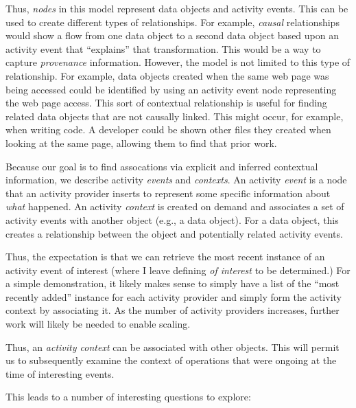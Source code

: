 \documentclass[sigconf,anonymous,review]{acmart}
\begin{document}
Thus, \emph{nodes} in this model represent data objects and activity events.
This can be used to create different types of relationships.  For example,
\emph{causal} relationships would show a flow from one data object to a second
data object based upon an activity event that ``explains'' that transformation.
This would be a way to capture \emph{provenance} information.  However, the
model is not limited to this type of relationship.  For example, data objects
created when the same web page was being accessed could be identified by using
an activity event node representing the web page access.  This sort of
contextual relationship is useful for finding related data objects that are not
causally linked.  This might occur, for example, when writing code.  A developer
could be shown other files they created when looking at the same page, allowing
them to find that prior work.

Because our goal is to find assocations via explicit and inferred contextual
information, we describe activity \emph{events} and \emph{contexts}.  An
activity \emph{event} is a node that an activity provider inserts to represent
some specific information about \emph{what} happened.  An activity
\emph{context} is created on demand and associates a set of activity events with
another object (e.g., a data object).  For a data object, this creates a
relationship between the object and potentially related activity events.

Thus, the expectation is that we can retrieve the most recent instance of an
activity event of interest (where I leave defining \emph{of interest} to be
determined.)  For a simple demonstration, it likely makes sense to simply have a
list of the ``most recently added'' instance for each activity provider and
simply form the activity context by associating it.  As the number of activity
providers increases, further work will likely be needed to enable scaling.

Thus, an \emph{activity context} can be associated with other objects.  This
will permit us to subsequently examine the context of operations that were
ongoing at the time of interesting events.

This leads to a number of interesting questions to explore:
\end{document}

